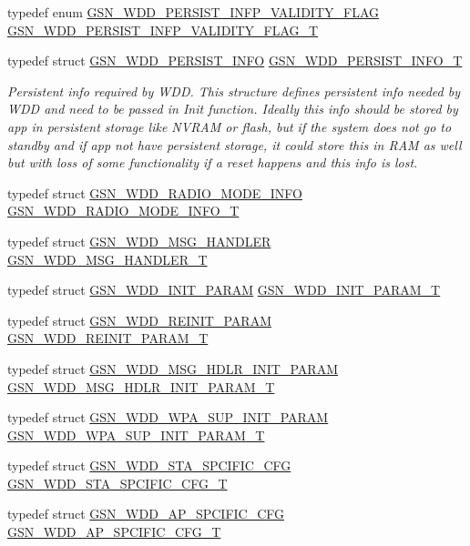 \begin{DoxyCompactItemize}
typedef enum \hyperlink{a00603_a12a943db28b7331351c75b7c2105966d}{GSN\_\-WDD\_\-PERSIST\_\-INFP\_\-VALIDITY\_\-FLAG} \hyperlink{a00603_ab1b47d2a6c940fb05451eebc74ea3852}{GSN\_\-WDD\_\-PERSIST\_\-INFP\_\-VALIDITY\_\-FLAG\_\-T}
\item 
typedef struct \hyperlink{a00282}{GSN\_\-WDD\_\-PERSIST\_\-INFO} \hyperlink{a00677_gaf6471274c5e1eeaf77be72eab076204e}{GSN\_\-WDD\_\-PERSIST\_\-INFO\_\-T}
\begin{DoxyCompactList}\small\item\em Persistent info required by WDD. This structure defines persistent info needed by WDD and need to be passed in Init function. Ideally this info should be stored by app in persistent storage like NVRAM or flash, but if the system does not go to standby and if app not have persistent storage, it could store this in RAM as well but with loss of some functionality if a reset happens and this info is lost. \end{DoxyCompactList}\item 
typedef struct \hyperlink{a00283}{GSN\_\-WDD\_\-RADIO\_\-MODE\_\-INFO} \hyperlink{a00603_a33ed28c15746622883e32280cde99faa}{GSN\_\-WDD\_\-RADIO\_\-MODE\_\-INFO\_\-T}
\item 
typedef struct \hyperlink{a00279}{GSN\_\-WDD\_\-MSG\_\-HANDLER} \hyperlink{a00603_a3a9ea76a32ca09c14f5b82effc28f0fa}{GSN\_\-WDD\_\-MSG\_\-HANDLER\_\-T}
\item 
typedef struct \hyperlink{a00276}{GSN\_\-WDD\_\-INIT\_\-PARAM} \hyperlink{a00603_a3906d6f291df3ccb5d770f1fe7eec5e4}{GSN\_\-WDD\_\-INIT\_\-PARAM\_\-T}
\item 
typedef struct \hyperlink{a00284}{GSN\_\-WDD\_\-REINIT\_\-PARAM} \hyperlink{a00603_a8aef612ff6b195fa978a7e8e88c66baa}{GSN\_\-WDD\_\-REINIT\_\-PARAM\_\-T}
\item 
typedef struct \hyperlink{a00280}{GSN\_\-WDD\_\-MSG\_\-HDLR\_\-INIT\_\-PARAM} \hyperlink{a00603_a526ef12a3d0b565b524257aa27e62652}{GSN\_\-WDD\_\-MSG\_\-HDLR\_\-INIT\_\-PARAM\_\-T}
\item 
typedef struct \hyperlink{a00304}{GSN\_\-WDD\_\-WPA\_\-SUP\_\-INIT\_\-PARAM} \hyperlink{a00603_af389db63bae9a429126b4447bbe046c3}{GSN\_\-WDD\_\-WPA\_\-SUP\_\-INIT\_\-PARAM\_\-T}
\item 
typedef struct \hyperlink{a00300}{GSN\_\-WDD\_\-STA\_\-SPCIFIC\_\-CFG} \hyperlink{a00603_a8191aefa707f0e98b4e0ea3b6030ce5e}{GSN\_\-WDD\_\-STA\_\-SPCIFIC\_\-CFG\_\-T}
\item 
typedef struct \hyperlink{a00271}{GSN\_\-WDD\_\-AP\_\-SPCIFIC\_\-CFG} \hyperlink{a00603_a1b8ae0d5ebc50c0a8704758bf4a472cd}{GSN\_\-WDD\_\-AP\_\-SPCIFIC\_\-CFG\_\-T}

\end{DoxyCompactItemize}
